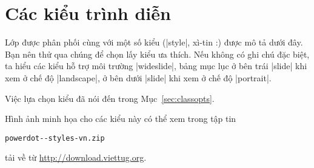 
\section{\texorpdfstring{Các kiểu trình diễn}{Cac kieu trinh dien}}
\label{sec:styles}

Lớp 
được phân phối cùng với một số kiểu (|style|, xì-tin :) được mô tả
dưới đây. Bạn nên thử qua chúng để chọn lấy kiểu ưa thích.
Nếu không có ghi chú đặc biệt, ta hiểu các kiểu hỗ trợ môi trường |wideslide|,
bảng mục lục ở bên trái |slide| khi xem ở chế độ |landscape|,
ở bên dưới |slide| khi xem ở chế độ |portrait|.

Việc lựa chọn kiểu đã nói đến trong Mục~\vref{sec:classopts}.

\medskip
Hình ảnh minh họa cho các kiểu này có thể xem trong tập tin\\
\centerline{\texttt{powerdot-\pdversion-styles-vn.zip}}
tải về từ \url{http://download.viettug.org}.

